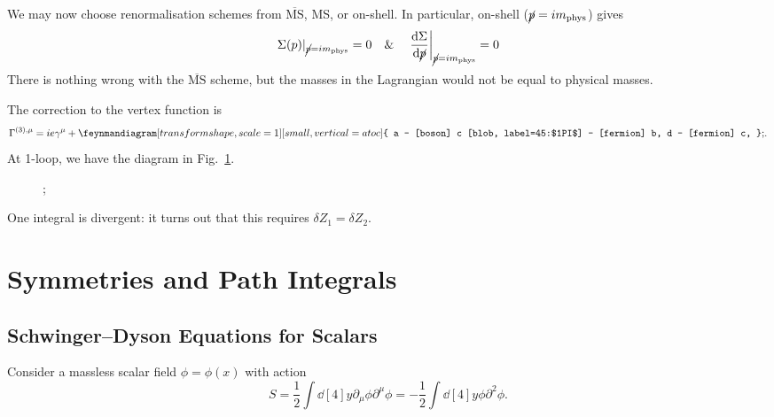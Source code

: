 We may now choose renormalisation schemes from $\overline{\text{MS}}{}$, MS, or on-shell.
In particular, on-shell ($\cancel{p} = i m_{\text{phys}}$) gives
\begin{equation}
  \Sigma(p) \rvert_{\cancel{p} = i m_{\text{phys}}} = 0 \quad \& \quad
  \left.\dv{\Sigma}{\cancel{p}} \right\rvert_{\cancel{p} = i m_{\text{phys}}} = 0
\end{equation}
There is nothing wrong with the $\overline{\text{MS}}{}$ scheme, but the masses in the Lagrangian would not be equal to physical masses. 

The correction to the vertex function is
\begin{equation}
  \Gamma^{(3), \mu}  = i e \gamma^{\mu} + 
  \begin{gathered}
    \feynmandiagram[transform shape, scale=1][small, vertical=a to c] {
      a -- [boson] c [blob, label=45:$1PI$] -- [fermion] b,
      d -- [fermion] c,
    };
  \end{gathered}.
\end{equation}
At 1-loop, we have the diagram in Fig.~\ref{fig:l18d1}.
\begin{figure}[tbhp]
  \centering
  ;
  \caption{}
  \label{fig:l18d1}
\end{figure}
One integral is divergent: it turns out that this requires $\delta Z_1 = \delta Z_2$.

\chapter{Symmetries and Path Integrals}%
\label{cha:symmetries_and_path_integrals}


\section{Schwinger--Dyson Equations for Scalars}%
\label{sec:schwinger_dyson_equations_and_scalars}

Consider a massless scalar field $\phi = \phi(x)$ with action
\begin{equation}
  S = \frac{1}{2} \int \dd[4]{y} \partial_{\mu} \phi \partial^{\mu} \phi = -\frac{1}{2} \int \dd[4]{y} \phi \partial^2 \phi.
\end{equation}

